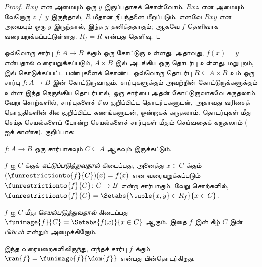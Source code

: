 \documentclass[../../../include/open-logic-section]{subfiles}
\begin{document}
\begin{proof}
$Rxy$ என அமையும் ஒரு $y$ இருப்பதாகக் கொள்வோம்.
$Rxz$ என அமையும் வேறொரு $z \neq
y$ இருந்தால், $R$ மீதான நிபந்தனை மீறப்படும்.
எனவே $Rxy$ என அமையும் ஒரு $y$ இருந்தால், இந்த $y$ தனித்ததாகும்;
ஆகவே $f$ தெளிவாக வரையறுக்கப்பட்டுள்ளது. $R_f = R$ என்பது தெளிவு.
\end{proof}

\begin{explain}
ஒவ்வொரு சார்பு $f\colon A \to B$ க்கும் ஒரு கோட்டுரு உள்ளது.
அதாவது, $f(x) = y$ என்பதால் வரையறுக்கப்படும்,
$A \times B$ இல் அடங்கிய ஒரு தொடர்பு உள்ளது.
மறுபுறம்,  இல் கொடுக்கப்பட்ட பண்புகளைக்
கொண்ட ஒவ்வொரு தொடர்பு $R
\subseteq A \times B$ உம் ஒரு சார்பு $f \colon A \to
B$ இன் கோட்டுருவாகும்.
சார்புகளுக்கும் அவற்றின் கோட்டுருக்களுக்கும் உள்ள இந்த நெருங்கிய
தொடர்பால், ஒரு சார்பை அதன் கோட்டுருவாகவே கருதலாம்.
வேறு சொற்களில், சார்புகளைச் சில குறிப்பிட்ட தொடர்புகளுடன், அதாவது
வரிசைத் தொகுதிகளின் சில குறிப்பிட்ட கணங்களுடன், ஒன்றாகக் கருதலாம்.
தொடர்புகள் மீது செய்த செயல்களைப் போன்ற செயல்களைச் சார்புகள் மீதும்
செய்வதைக் கருதலாம் ( ஐக் காண்க).
குறிப்பாக:
\end{explain}

\begin{defn}
$f \colon A \to B$ ஒரு சார்பாகவும் $C\subseteq A$ ஆகவும் இருக்கட்டும்.

$f$ ஐ $C$ க்குக் \emph{கட்டுப்படுத்துவதால்} கிடைப்பது,
அனைத்து $x \in C$ க்கும் $(\funrestrictionto{f}{C})(x) = f(x)$
என வரையறுக்கப்படும் $\funrestrictionto{f}{C}\colon C \to B$
என்ற சார்பாகும். வேறு சொற்களில்,
$\funrestrictionto{f}{C} = \Setabs{\tuple{x, y} \in R_f}{x \in
C}$.

$f$ ஐ $C$ மீது \emph{செயல்படுத்துவதால்} கிடைப்பது
$\funimage{f}{C} =
\Setabs{f(x)}{x \in C}$ ஆகும். இதை $f$ இன் கீழ் $C$ இன்
\emph{பிம்பம்} என்றும் அழைக்கிறோம்.
\end{defn}

\begin{explain}
இந்த வரையறைகளிலிருந்து, எந்தச் சார்பு $f$ க்கும்
$\ran{f} =
\funimage{f}{\dom{f}}$ என்பது பின்தொடர்கிறது.
\end{explain}
\end{document}
